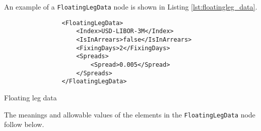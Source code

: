 An example of a \lstinline!FloatingLegData! node is shown in Listing \ref{lst:floatingleg_data}.
\begin{listing}[H]
\begin{verbatim}
                <FloatingLegData>
                    <Index>USD-LIBOR-3M</Index>
                    <IsInArrears>false</IsInArrears>
                    <FixingDays>2</FixingDays>
                    <Spreads>
                        <Spread>0.005</Spread>
                    </Spreads>
                </FloatingLegData>
\end{verbatim}
\caption{Floating leg data}
\label{lst:floatingleg_data}
\end{listing}

The meanings and allowable values of the elements in the \lstinline!FloatingLegData! node follow below.

